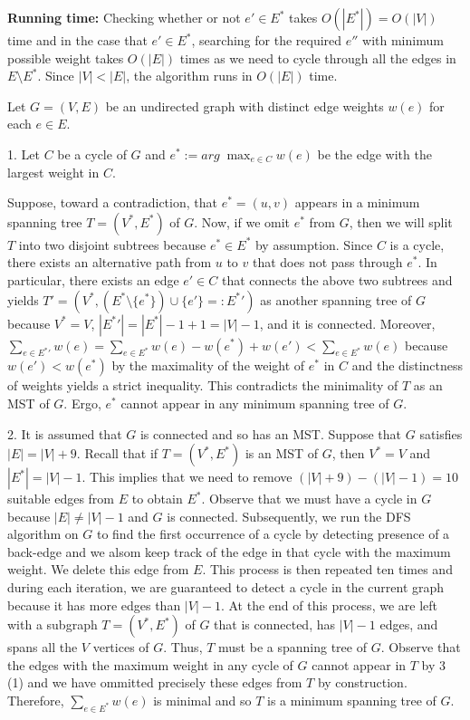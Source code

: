 \documentclass[tikz, letterpaper,12pt]{article}
\makeatletter
\newcounter{problemid}\stepcounter{problemid}
\def\newproblem{\vspace*{0.01cm}{\bf Problem~\arabic{problemid}\stepcounter{problemid}}\hfill\fbox{\parbox{0.16\textwidth}{\bf Points:}}\par}
\renewenvironment{proof}[1][\proofname]{\par
  \vspace{-\topsep}%
  \pushQED{\qed}%
  \normalfont
  \topsep4pt \partopsep1pt %
  \trivlist
  \item[\hskip\labelsep
        \itshape
    #1\@addpunct{.}]\ignorespaces
}{%
  \popQED\endtrivlist\@endpefalse
  \addvspace{6pt plus 6pt} %
}
\makeatother
\begin{document}
\textbf{Running time:} Checking whether or not $e'\in E^{*}$ takes $O(|E^{*}|)=O(|V|)$ time and in the case that $e'\in E^{*}$, searching for the required $e''$ with minimum possible weight takes $O(|E|)$ times as we need to cycle through all the edges in $E\setminus E^{*}$. Since $|V|<|E|$, the algorithm runs in $O(|E|)$ time.

\newproblem
Let $G=(V,E)$ be an undirected graph with distinct edge weights $w(e)$ for each $e\in E$.

1. Let $C$ be a cycle of $G$ and $e^{*}:=arg\;\max_{e\in C}w(e)$ be the edge with the largest weight in $C$.
\begin{proof}Suppose, toward a contradiction, that $e^{*}=(u,v)$ appears in a minimum spanning tree $T=(V^{*},E^{*})$ of $G$. Now, if we omit $e^{*}$ from $G$, then we will split $T$ into two disjoint subtrees because $e^{*}\in E^{*}$ by assumption. Since $C$ is a cycle, there exists an alternative path from $u$ to $v$ that does not pass through $e^{*}$. In particular, there exists an edge $e'\in C$ that connects the above two subtrees and yields $T'=(V^{*},(E^{*}\setminus\{e^{*}\})\cup\{e'\}=:E^{*}')$ as another spanning tree of $G$ because $V^{*}=V$, $|E^{*}'|=|E^{*}|-1+1=|V|-1$, and it is connected. Moreover, $\sum_{e\in E^{*}'}w(e)=\sum_{e\in E^{*}}w(e)-w(e^*)+w(e')<\sum_{e\in E^{*}}w(e)$ because $w(e')<w(e^*)$ by the maximality of the weight of $e^{*}$ in $C$ and the distinctness of weights yields a strict inequality. This contradicts the minimality of $T$ as an MST of $G$. Ergo, $e^{*}$ cannot appear in any minimum spanning tree of $G$.
\end{proof}

2. It is assumed that $G$ is connected and so has an MST. Suppose that $G$ satisfies $|E|=|V|+9$. Recall that if $T=(V^{*},E^{*})$ is an MST of $G$, then $V^{*}=V$ and $|E^{*}|=|V|-1$. This implies that we need to remove $(|V|+9)-(|V|-1)=10$ suitable edges from $E$ to obtain $E^{*}$. Observe that we must have a cycle in $G$ because $|E|\neq |V|-1$ and $G$ is connected. Subsequently, we run the DFS algorithm on $G$ to find the first occurrence of a cycle by detecting presence of a back-edge and we alsom keep track of the edge in that cycle with the maximum weight. We delete this edge from $E$. This process is then repeated ten times and during each iteration, we are guaranteed to detect a cycle in the current graph because it has more edges than $|V|-1$. At the end of this process, we are left with a subgraph $T=(V^{*},E^{*})$ of $G$ that is connected, has $|V|-1$ edges, and spans all the $V$ vertices of $G$. Thus, $T$ must be a spanning tree of $G$. Observe that the edges with the maximum weight in any cycle of $G$ cannot appear in $T$ by 3 (1) and we have ommitted precisely these edges from $T$ by construction. Therefore, $\sum_{e\in E^{*}}w(e)$ is minimal and so $T$ is a minimum spanning tree of $G$.
\end{document}
